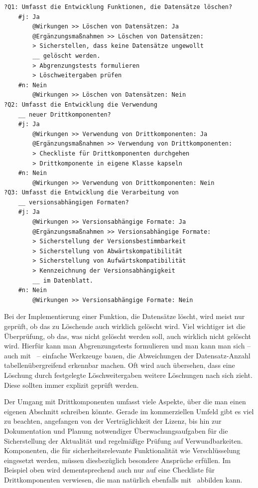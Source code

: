 \begin{verbatim}
?Q1: Umfasst die Entwicklung Funktionen, die Datensätze löschen?
    #j: Ja
        @Wirkungen >> Löschen von Datensätzen: Ja
        @Ergänzungsmaßnahmen >> Löschen von Datensätzen:
        > Sicherstellen, dass keine Datensätze ungewollt 
        __ gelöscht werden.
        > Abgrenzungstests formulieren
        > Löschweitergaben prüfen
    #n: Nein
        @Wirkungen >> Löschen von Datensätzen: Nein
?Q2: Umfasst die Entwicklung die Verwendung
    __ neuer Drittkomponenten?
    #j: Ja
        @Wirkungen >> Verwendung von Drittkomponenten: Ja
        @Ergänzungsmaßnahmen >> Verwendung von Drittkomponenten:
        > Checkliste für Drittkomponenten durchgehen
        > Drittkomponente in eigene Klasse kapseln
    #n: Nein
        @Wirkungen >> Verwendung von Drittkomponenten: Nein
?Q3: Umfasst die Entwicklung die Verarbeitung von 
    __ versionsabhängigen Formaten?
    #j: Ja
        @Wirkungen >> Versionsabhängige Formate: Ja
        @Ergänzungsmaßnahmen >> Versionsabhängige Formate:
        > Sicherstellung der Versionsbestimmbarkeit
        > Sicherstellung von Abwärtskompatibilität
        > Sicherstellung von Aufwärtskompatibilität
        > Kennzeichnung der Versionsabhängigkeit 
        __ im Datenblatt.
    #n: Nein
        @Wirkungen >> Versionsabhängige Formate: Nein
\end{verbatim}

Bei der Implementierung einer Funktion, die Datensätze löscht, wird meist nur geprüft, ob das zu Löschende auch wirklich gelöscht wird. Viel wichtiger ist die Überprüfung, ob das, was nicht gelöscht werden soll, auch wirklich nicht gelöscht wird. Hierfür kann man Abgrenzungstests formulieren und man kann man sich -- auch mit \FPZ\ -- einfache Werkzeuge bauen, die Abweichungen der Datensatz-Anzahl tabellenübergreifend erkennbar machen. Oft wird auch übersehen, dass eine Löschung durch festgelegte Löschweitergaben weitere Löschungen nach sich zieht. Diese sollten immer explizit geprüft werden.

Der Umgang mit Drittkomponenten umfasst viele Aspekte, über die man einen eigenen Abschnitt schreiben könnte. Gerade im kommerziellen Umfeld gibt es viel zu beachten, angefangen von der Verträglichkeit der Lizenz, bis hin zur Dokumentation und Planung notwendiger Überwachungsaufgaben für die Sicherstellung der Aktualität und regelmäßige Prüfung auf Verwundbarkeiten. Komponenten, die für sicherheitsrelevante Funktionalität wie Verschlüsselung eingesetzt werden, müssen diesbezüglich besondere Ansprüche erfüllen. Im Beispiel oben wird dementsprechend auch nur auf eine Checkliste für Drittkomponenten verwiesen, die man natürlich ebenfalls mit \FPZ\ abbilden kann. 

